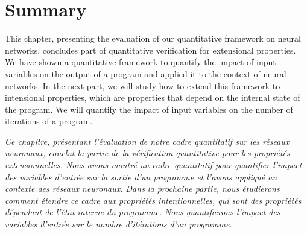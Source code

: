 \section{Summary}

This chapter, presenting the evaluation of our quantitative framework on neural networks, concludes part of quantitative verification for extensional properties.
We have shown a quantitative framework to quantify the impact of input variables on the output of a program and applied it to the context of neural networks.
In the next part, we will study how to extend this framework to intensional properties, which are properties that depend on the internal state of the program.
We will quantify the impact of input variables on the number of iterations of a program.


\frenchdiv

\emph{Ce chapitre, présentant l'évaluation de notre cadre quantitatif sur les réseaux neuronaux, conclut la partie de la vérification quantitative pour les propriétés extensionnelles. Nous avons montré un cadre quantitatif pour quantifier l'impact des variables d'entrée sur la sortie d'un programme et l'avons appliqué au contexte des réseaux neuronaux. Dans la prochaine partie, nous étudierons comment étendre ce cadre aux propriétés intentionnelles, qui sont des propriétés dépendant de l'état interne du programme. Nous quantifierons l'impact des variables d'entrée sur le nombre d'itérations d'un programme.}
